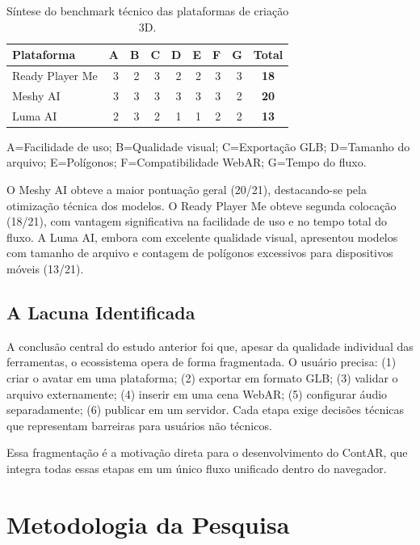 \documentclass[
  12pt,
  openright,
  twoside,
  a4paper,
  english,
  brazil
]{abntex2}
\begin{document}
\begin{table}[ht]
  \caption{Síntese do benchmark técnico das plataformas de criação 3D.}
  \label{tab:benchmark-anterior}
  \centering
  \begin{tabular}{lrrrrrrrc}
    \toprule
    \textbf{Plataforma} & \textbf{A} & \textbf{B} & \textbf{C} &
    \textbf{D} & \textbf{E} & \textbf{F} & \textbf{G} & \textbf{Total} \\
    \midrule
    Ready Player Me & 3 & 2 & 3 & 2 & 2 & 3 & 3 & \textbf{18} \\
    Meshy AI        & 3 & 3 & 3 & 3 & 3 & 3 & 2 & \textbf{20} \\
    Luma AI         & 2 & 3 & 2 & 1 & 1 & 2 & 2 & \textbf{13} \\
    \bottomrule
  \end{tabular}
  \vspace{0.3em}
  \footnotesize{A=Facilidade de uso; B=Qualidade visual; C=Exportação GLB;
  D=Tamanho do arquivo; E=Polígonos; F=Compatibilidade WebAR; G=Tempo do fluxo.}
\end{table}

O Meshy AI obteve a maior pontuação geral (20/21), destacando-se pela
otimização técnica dos modelos. O Ready Player Me obteve segunda colocação
(18/21), com vantagem significativa na facilidade de uso e no tempo total
do fluxo. A Luma AI, embora com excelente qualidade visual, apresentou
modelos com tamanho de arquivo e contagem de polígonos excessivos para
dispositivos móveis (13/21).

\section{A Lacuna Identificada}
\label{sec:lacuna}

A conclusão central do estudo anterior foi que, apesar da qualidade
individual das ferramentas, o ecossistema opera de forma fragmentada.
O usuário precisa: (1) criar o avatar em uma plataforma; (2) exportar
em formato GLB; (3) validar o arquivo externamente; (4) inserir em uma
cena WebAR; (5) configurar áudio separadamente; (6) publicar em um servidor.
Cada etapa exige decisões técnicas que representam barreiras para
usuários não técnicos.

Essa fragmentação é a motivação direta para o desenvolvimento do ContAR,
que integra todas essas etapas em um único fluxo unificado dentro do
navegador.


\chapter{Metodologia da Pesquisa}
\label{cap:metodologia}
\end{document}
